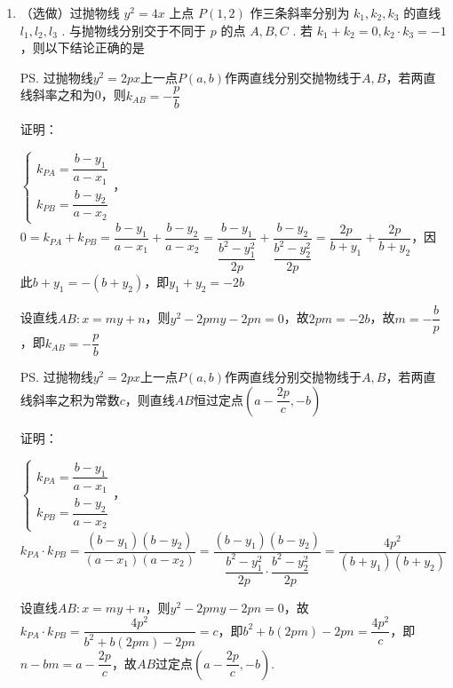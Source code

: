 \begin{enumerate}
\begin{jieda}
\begin{enumerate}
            故$H$在以$AM$为直径的圆$(x-0)(x+1)+(y-1)(y+1) = 0$，即$x^2+x+y^2 = 1$上.
        \end{enumerate}
    \end{jieda}

    \item （选做）过抛物线 ${y^2} = {4x}$ 上点 $P\left( {1,2}\right)$ 作三条斜率分别为 ${k}_{1},{k}_{2},{k}_{3}$ 的直线 ${l}_{1},{l}_{2},{l}_{3}$ . 与抛物线分别交于不同于 $p$ 的点 $A,B,C$ . 若 ${k}_{1} + {k}_{2} = 0,{k}_{2} \cdot  {k}_{3} =  - 1$，则以下结论正确的是
    \begin{jieda}
        \ps 过抛物线$y^2 = 2px$上一点$P(a, b)$作两直线分别交抛物线于$A, B$，若两直线斜率之和为0，则$k_{AB} = -\dfrac{p}{b}$ 

        证明：

        $\left\{\begin{array}{l}
            k_{PA} = \dfrac{b-y_1}{a - x_1} \\
            k_{PB} = \dfrac{b-y_2}{a - x_2}
        \end{array}\right.$，$0 = k_{PA} + k_{PB} = \dfrac{b-y_1}{a - x_1} + \dfrac{b-y_2}{a - x_2} = \dfrac{b-y_1}{\dfrac{b^2-y_1^2}{2p}} + \dfrac{b-y_2}{\dfrac{b^2-y_2^2}{2p}} = \dfrac{2p}{b+y_1} + \dfrac{2p}{b+y_2}$，因此$b+y_1 = -(b+y_2)$，即$y_1+y_2 = -2b$
        
        设直线$AB: x = my + n$，则$y^2 - 2pmy - 2pn = 0$，故$2pm = -2b$，故$m = -\dfrac{b}{p}$，即$k_{AB} = -\dfrac{p}{b}$ 

        \ps 过抛物线$y^2 = 2px$上一点$P(a, b)$作两直线分别交抛物线于$A, B$，若两直线斜率之积为常数$c$，则直线$AB$恒过定点$\left(a-\dfrac{2p}{c}, -b\right)$

        证明：

        $\left\{\begin{array}{l}
            k_{PA} = \dfrac{b-y_1}{a - x_1} \\
            k_{PB} = \dfrac{b-y_2}{a - x_2}
        \end{array}\right.$，$k_{PA} \cdot k_{PB} = \dfrac{(b-y_1)(b-y_2)}{(a-x_1)(a-x_2)} = \dfrac{(b-y_1)(b-y_2)}{\dfrac{b^2-y_1^2}{2p} \cdot \dfrac{b^2-y_2^2}{2p}} = \dfrac{4p^2}{(b+y_1)(b+y_2)}$

        设直线$AB: x = my + n$，则$y^2 - 2pmy - 2pn = 0$，故$k_{PA} \cdot k_{PB} = \dfrac{4p^2}{b^2+b(2pm)-2pn} = c$，即$b^2+b(2pm)-2pn = \dfrac{4p^2}{c}$，即$n - bm = a - \dfrac{2p}{c}$，故$AB$过定点$\left(a-\dfrac{2p}{c}, -b\right)$.
    \end{jieda}
\end{enumerate}

